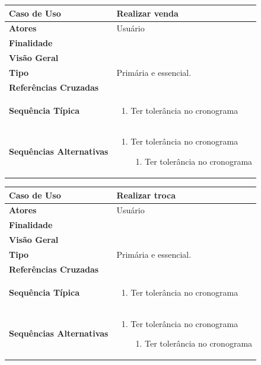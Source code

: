 \documentclass[a4paper,11pt]{article}
\begin{document}
\begin{table}[H]
		\begin{tabularx}{\textwidth}{|l|X|}
		\hline
			\textbf{Caso de Uso} &  Realizar venda \\ \hline
			\textbf{Atores} &  Usuário  \\ \hline
			\textbf{Finalidade} &   \\ \hline
			\textbf{Visão Geral} &  \\ \hline
			\textbf{Tipo} & Primária e essencial. \\ \hline
			\textbf{Referências Cruzadas} &  \\ \hline
			\textbf{Sequência Típica} & 
			\begin{enumerate}
			\item Ter tolerância no cronograma
			\end{enumerate} \\ \hline
			\textbf{Sequências Alternativas} & 
			\begin{enumerate}
			\item Ter tolerância no cronograma
			\begin{enumerate}
			\item Ter tolerância no cronograma
			\end{enumerate}
			\end{enumerate} \\ \hline
		\end{tabularx}
\end{table}

\begin{table}[H]
		\begin{tabularx}{\textwidth}{|l|X|}
		\hline
			\textbf{Caso de Uso} &  Realizar troca \\ \hline
			\textbf{Atores} &  Usuário  \\ \hline
			\textbf{Finalidade} &   \\ \hline
			\textbf{Visão Geral} &  \\ \hline
			\textbf{Tipo} & Primária e essencial. \\ \hline
			\textbf{Referências Cruzadas} &  \\ \hline
			\textbf{Sequência Típica} & 
			\begin{enumerate}
			\item Ter tolerância no cronograma
			\end{enumerate} \\ \hline
			\textbf{Sequências Alternativas} & 
			\begin{enumerate}
			\item Ter tolerância no cronograma
			\begin{enumerate}
			\item Ter tolerância no cronograma
			\end{enumerate}
			\end{enumerate} \\ \hline
		\end{tabularx}
\end{table}
\end{document}
